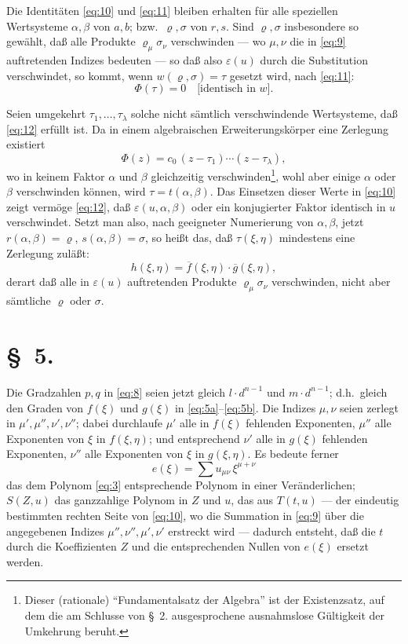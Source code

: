 \documentclass[fontsize=10pt,paper=a5,pagesize,headings=small]{scrbook}
\theoremstyle{plain}
\begin{document}
Die Identitäten \eqref{eq:10} und \eqref{eq:11} bleiben erhalten für alle speziellen
Wertsysteme $\alpha,\beta$ von $a,b$; bzw.~$\varrho,\sigma$ von $r,s$. Sind $\varrho,\sigma$ insbesondere
so gewählt, daß alle Produkte $\varrho_\mu \sigma_\nu$ verschwinden --- wo $\mu,\nu$ die in
\eqref{eq:9} auftretenden Indizes bedeuten --- so daß also $\varepsilon(u)$ durch die Substitution
verschwindet, so kommt, wenn $w(\varrho,\sigma) = \tau$ gesetzt wird, nach \eqref{eq:11}:
\begin{equation}
\label{eq:12}
\varPhi(\tau) = 0 \quad \text{[identisch in $w$]}.
\end{equation}

Seien umgekehrt $\tau_1,\dots,\tau_\lambda$ solche nicht sämtlich verschwindende Wertsysteme,
daß \eqref{eq:12} erfüllt ist. Da in einem algebraischen Erweiterungskörper eine
Zerlegung existiert
\begin{equation}
\label{eq:12a}
\varPhi(z) = c_0\,(z-\tau_1)\cdots(z-\tau_\lambda),
\end{equation}
wo in keinem Faktor $\alpha$ und $\beta$ gleichzeitig verschwinden\footnote{Dieser (rationale)
``Fundamentalsatz der Algebra'' ist der Existenzsatz, auf dem die am Schlusse
von \S~2. ausgesprochene ausnahmslose Gültigkeit der Umkehrung beruht.},
wohl aber einige $\alpha$ oder $\beta$ verschwinden können, wird $\tau = t(\alpha,\beta)$.
Das Einsetzen dieser Werte in \eqref{eq:10} zeigt vermöge \eqref{eq:12}, daß
$\varepsilon(u,\alpha,\beta)$ oder ein konjugierter Faktor identisch in $u$ verschwindet.
Setzt man also, nach geeigneter Numerierung von $\alpha,\beta$, jetzt
$r(\alpha,\beta) = \varrho$, $s(\alpha,\beta) = \sigma$, so heißt das, daß $\tau(\xi,\eta)$ mindestens
eine Zerlegung zuläßt:
\begin{equation}
\label{eq:13}
h(\xi,\eta) = \overline{f}(\xi,\eta) \cdot \overline{g}(\xi,\eta),
\end{equation}
derart daß alle in $\varepsilon(u)$ auftretenden Produkte $\varrho_\mu \sigma_\nu$ verschwinden, nicht
aber sämtliche $\varrho$ oder $\sigma$.

\section*{\S~5.}
\setcounter{section}{5}

Die Gradzahlen $p,q$ in \eqref{eq:8} seien jetzt gleich $l \cdot d^{n-1}$ und
$m \cdot d^{n-1}$; d.h.~gleich den Graden von $f(\xi)$ und $g(\xi)$ in \eqref{eq:5a}--\eqref{eq:5b}.
Die Indizes $\mu,\nu$ seien zerlegt in $\mu',\mu'',\nu',\nu''$; dabei durchlaufe $\mu'$
alle in $f(\xi)$ fehlenden Exponenten, $\mu''$ alle Exponenten von $\xi$ in $f(\xi,\eta)$;
und entsprechend $\nu'$ alle in $g(\xi)$ fehlenden Exponenten, $\nu''$ alle Exponenten
von $\xi$ in $g(\xi,\eta)$. Es bedeute ferner
\[ e(\xi) = \sum u_{\mu\nu}\,\xi^{\mu+\nu} \]
das dem Polynom \eqref{eq:3} entsprechende Polynom in einer Veränderlichen;
$S(Z,u)$ das ganzzahlige Polynom in $Z$ und $u$, das aus $T(t,u)$ --- der
eindeutig bestimmten rechten Seite von \eqref{eq:10}, wo die Summation in
\eqref{eq:9} über die angegebenen Indizes $\mu'',\nu'',\mu',\nu'$ erstreckt wird ---
dadurch entsteht, daß die $t$ durch die Koeffizienten $Z$ und die entsprechenden
Nullen von $e(\xi)$ ersetzt werden.
\end{document}
